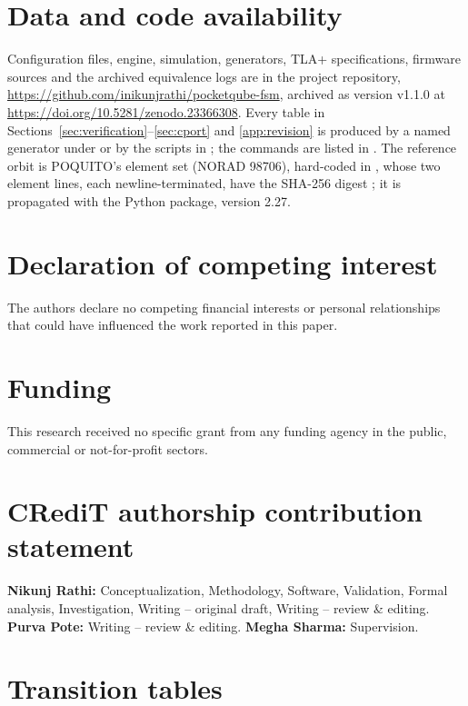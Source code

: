 \documentclass[preprint,12pt]{elsarticle}
\begin{document}
\section*{Data and code availability}
Configuration files, engine, simulation, generators, TLA+ specifications, firmware sources and the archived equivalence logs are in the project repository, \url{https://github.com/inikunjrathi/pocketqube-fsm}, archived as version v1.1.0 at \url{https://doi.org/10.5281/zenodo.23366308}. Every table in Sections~\ref{sec:verification}--\ref{sec:cport} and \ref{app:revision} is produced by a named generator under  or by the scripts in ; the commands are listed in . The reference orbit is POQUITO's element set (NORAD 98706), hard-coded in , whose two element lines, each newline-terminated, have the SHA-256 digest  ; it is propagated with the  Python package, version 2.27.

\section*{Declaration of competing interest}
The authors declare no competing financial interests or personal relationships that could have influenced the work reported in this paper.

\section*{Funding}
This research received no specific grant from any funding agency in the public, commercial or not-for-profit sectors.

\section*{CRediT authorship contribution statement}
\textbf{Nikunj Rathi:} Conceptualization, Methodology, Software, Validation, Formal analysis, Investigation, Writing -- original draft, Writing -- review \& editing.
\textbf{Purva Pote:} Writing -- review \& editing.
\textbf{Megha Sharma:} Supervision.

\appendix
\section{Transition tables}\label{app:transitions}

\end{document}
